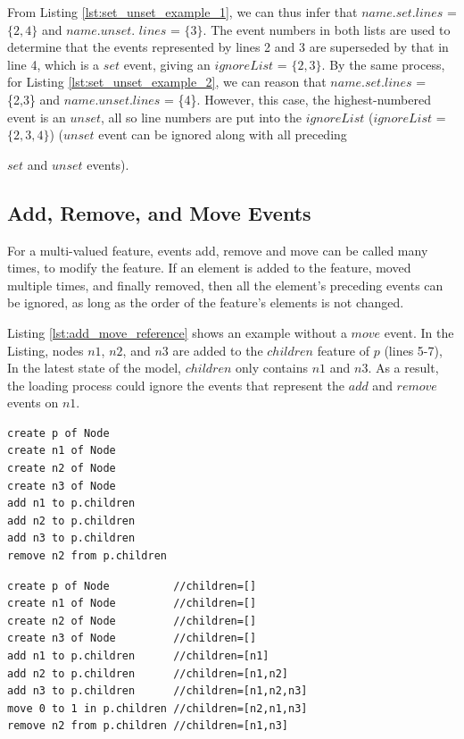 \documentclass{llncs}
\begin{document}
    From Listing \ref{lst:set_unset_example_1}, we can thus infer that $name$.$set$.$lines$ = $\{2,4\}$ and $name$.$unset$. $lines$ = $\{3\}$. The event numbers in both lists are used to determine that the events represented by lines 2 and 3 are superseded by that in line 4, which is a $set$ event, giving an $ignoreList$ = $\{2, 3\}$.  By the same process, for Listing \ref{lst:set_unset_example_2}, we can reason that $name$.$set$.$lines$ = \{2,3\} and $name$.$unset$.$lines$ = \{4\}.  However, this case, the highest-numbered event is an $unset$, all so line numbers are put into the $ignoreList$ ($ignoreList$ = $\{2, 3, 4\}$) ($unset$ event can be ignored along with all preceding {$set$ and $unset$ events). 
    
    \vspace{-10pt}
    \subsection{Add, Remove, and Move Events}\label{subsec:add_remove_and_move_operations}
    For a multi-valued feature, events add, remove and move can be called many times, to modify the feature. If an element is added to the feature, moved multiple times, and finally removed, then all the element's preceding events can be ignored, as long as the order of the feature's elements is not changed. 
    

    
    Listing \ref{lst:add_move_reference} shows an example without a $move$ event. In the Listing, nodes $n1$, $n2$, and $n3$ are added to the $children$ feature of $p$ (lines 5-7), In the latest state of the model, $children$ only contains $n1$ and $n3$. As a result, the loading process could ignore the events that represent the \textit{$add$} and \textit{$remove$} events on $n1$. 
    
    \vspace{-20pt}
    \begin{minipage}[t]{0.34\linewidth}
\begin{lstlisting}[style=eol,caption={A CBP of add and remove operations.},label=lst:add_move_reference]
create p of Node
create n1 of Node
create n2 of Node
create n3 of Node
add n1 to p.children
add n2 to p.children
add n3 to p.children
remove n2 from p.children   
\end{lstlisting}
    \end{minipage}
    \hfill
    \begin{minipage}[t]{0.62\linewidth}
\begin{lstlisting}[style=eol,caption={A CBP representation of add, move, and remove operations.},label=lst:add_remove_move_reference]
create p of Node          //children=[]
create n1 of Node         //children=[]
create n2 of Node         //children=[]
create n3 of Node         //children=[]
add n1 to p.children      //children=[n1]
add n2 to p.children      //children=[n1,n2]
add n3 to p.children      //children=[n1,n2,n3]
move 0 to 1 in p.children //children=[n2,n1,n3]
remove n2 from p.children //children=[n1,n3]
\end{lstlisting}
    \end{minipage}

}
\end{document}

